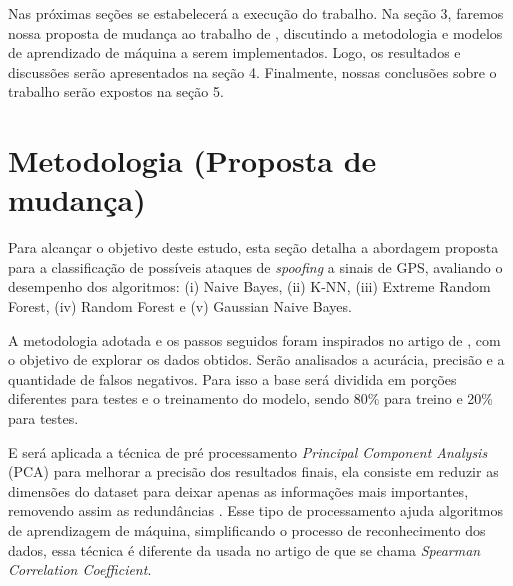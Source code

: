 \documentclass[12pt]{article}
\begin{document}
Nas próximas seções se estabelecerá a execução do trabalho. Na seção 3, faremos 
nossa proposta de mudança ao trabalho de \cite{Aissou2021}, discutindo a 
metodologia e modelos de aprendizado de máquina a
serem implementados. Logo, os resultados e 
discussões serão apresentados na seção 4. Finalmente, nossas conclusões sobre o 
trabalho serão expostos na seção 5.

\section{Metodologia (Proposta de mudança)}

Para alcançar o objetivo deste estudo, esta seção detalha a abordagem proposta para a classificação de possíveis ataques de \textit{spoofing} 
a sinais de GPS, avaliando o desempenho dos algoritmos: (i) Naive Bayes, (ii) K-NN, (iii) Extreme Random Forest, (iv) Random Forest e (v)  Gaussian Naive Bayes.

A metodologia adotada e os passos seguidos foram inspirados no artigo de \cite{Aissou2021}, com o objetivo de explorar os dados obtidos. Serão analisados a acurácia, 
precisão e a quantidade de falsos negativos. 
Para isso a base será dividida em porções diferentes para testes e o treinamento do modelo, sendo 80\% para treino e 20\% para testes. 

E será aplicada a técnica de pré processamento \textit{Principal Component Analysis} (PCA) para melhorar a precisão dos resultados finais, ela consiste em reduzir as dimensões do dataset para deixar apenas as informações mais importantes, removendo assim as redundâncias \cite{IBM02025}. 
Esse tipo de processamento ajuda algoritmos de aprendizagem de máquina, simplificando o processo de reconhecimento dos dados, essa técnica é
diferente da usada no artigo de \cite{Aissou2021} que se chama \textit{Spearman Correlation Coefficient}.








\end{document}
